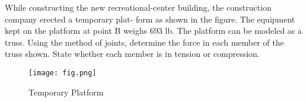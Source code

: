 
While constructing the new recreational-center building, the construction company erected a temporary plat-
form as shown in the figure. The equipment kept on the platform at point B weighs 693 lb. The platform can
be modeled as a truss. Using the method of joints, determine the force in each member of the truss shown.
State whether each member is in tension or compression.

\begin{figure}[ht!]
  \centering
  \texttt{[image: fig.png]}
  \caption*{Temporary Platform}
\end{figure}

\iftoggle{flagSoln}{%
\vspace{.5cm}
\rule{\textwidth}{.4pt}
\vspace{.5cm}
\textbf{Solution:}
\begin{figure}[ht!]
  \centering
  \texttt{[image: solna.png]}
  \texttt{[image: solnb.png]}
\end{figure}
}{%
}%
